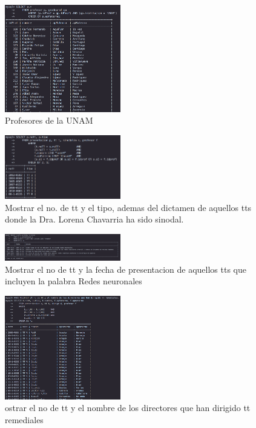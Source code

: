\documentclass[12pt, fleqn]{article}                             %
\begin{document}
        \begin{figure}[ht!]
            \centering
            \includegraphics[width=0.45\textwidth]{BD4Reporte7}
            \caption{Profesores de la UNAM}
        \end{figure}


        \begin{figure}[ht!]
            \centering
            \includegraphics[width=0.45\textwidth]{BD4Reporte8}
            \caption{Mostrar el no. de tt y el tipo, ademas del dictamen de aquellos tts donde
            la Dra. Lorena Chavarria ha sido sinodal.}
        \end{figure}

        \begin{figure}[ht!]
            \centering
            \includegraphics[width=0.45\textwidth]{BD4Reporte9}
            \caption{Mostrar el no de tt y la fecha de presentacion de aquellos tts que
            incluyen la palabra Redes neuronales}
        \end{figure}

        \begin{figure}[ht!]
            \centering
            \includegraphics[width=0.45\textwidth]{BD4Reporte10}
            \caption{ostrar el no de tt y el nombre de los directores que han dirigido tt
            remediales}
        \end{figure}
\end{document}
